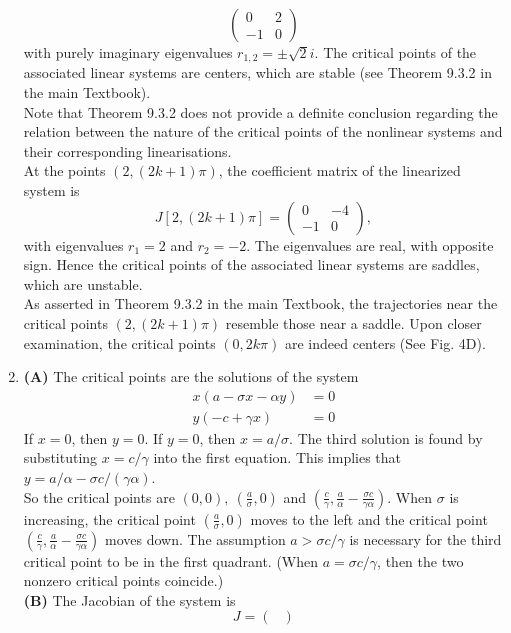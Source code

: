 \documentclass[11pt,a4paper]{article}
\begin{document}
\begin{enumerate}
$$\begin{pmatrix}
			0 & 2\\
			-1 & 0
		\end{pmatrix}
		$$
		with purely imaginary eigenvalues $r_{1,2} = \pm\sqrt{2}i$. The critical points of the associated linear systems are centers, which are stable (see Theorem 9.3.2 in the main Textbook).\\
		Note that Theorem 9.3.2 does not provide a definite conclusion regarding the relation between the nature of the critical points of the nonlinear systems and their corresponding linearisations.\\
		At the points $(2, (2k + 1)\pi)$, the coefficient matrix of the linearized system is
		$$
		J[2, (2k + 1)\pi] =
		\begin{pmatrix}
			0 & -4\\
			-1 & 0
		\end{pmatrix},
		$$
		with eigenvalues $r_1 = 2$ and $r_2 = -2$. The eigenvalues are real, with opposite sign. Hence the critical points of the associated linear systems are saddles, which are unstable.\\
		As asserted in Theorem 9.3.2 in the main Textbook, the trajectories near the critical points $(2,(2k+1)\pi)$ resemble those near a saddle. Upon closer examination, the critical points $(0, 2k\pi)$ are indeed centers (See Fig. 4D).
		\item \textbf{(A)} The critical points are the solutions of the system
		\begin{align*}
			x(a - \sigma x - \alpha y) &= 0\\
			y(-c + \gamma x) &= 0
		\end{align*}
		If $x = 0$, then $y = 0$. If $y = 0$, then $x = a/\sigma$. The third solution is found by substituting $x = c/\gamma$ into the first equation. This implies that $y = a/\alpha - \sigma c/(\gamma\alpha)$.\\
		So the critical points are $(0, 0),\ \left(\frac{a}{\sigma}, 0\right)$ and $\left(\frac{c}{\gamma}, \frac{a}{\alpha}-\frac{\sigma c}{\gamma \alpha}\right)$. When $\sigma$ is increasing, the critical point $\left(\frac{a}{\sigma}, 0\right)$ moves to the left and the critical point $\left(\frac{c}{\gamma}, \frac{a}{\alpha}-\frac{\sigma c}{\gamma \alpha}\right)$ moves down. The assumption $a > \sigma c/\gamma$ is necessary for the third critical point to be in the first quadrant. (When $a = \sigma c/\gamma$, then the two nonzero critical points coincide.)\\
		\textbf{(B)} The Jacobian of the system is
		$$
		J =
		\begin{pmatrix}

\end{pmatrix}$$
\end{enumerate}
\end{document}
